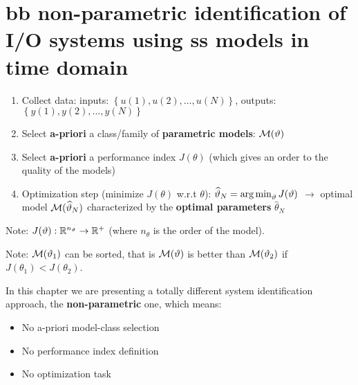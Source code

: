 \chapter{\acrlong{bb} non-parametric identification of I/O systems using \acrlong{ss} models in time domain}

\vspace{-12pt}
\begin{figure}[H]
    \centering
\end{figure}


\begin{remark}
\hfill \break
    \begin{enumerate}
        \item Collect data: inputs: $\left\{u(1), u(2), \ldots, u(N)\right\}$, outputs: $\left\{y(1), y(2), \ldots, y(N)\right\}$
        \item Select \textbf{a-priori} a class/family of \textbf{parametric models}: $\mathcal{M}(\vartheta)$
        \item Select \textbf{a-priori} a performance index $J(\theta)$ (which gives an order to the quality of the models)
        \item Optimization step (minimize $J(\theta)$ w.r.t $\theta$): $\widehat{\vartheta}_N = \operatorname*{arg\,min}_\vartheta J(\vartheta)$ $\rightarrow$ optimal model $\mathcal{M}(\widehat{\vartheta}_N)$ characterized by the \textbf{optimal parameters} $\hat{\theta}_N$
    \end{enumerate}
    
    Note:    $J(\vartheta): \mathbb{R}^{n_\vartheta} \rightarrow \mathbb{R}^+$ (where $n_\theta$ is the order of the model).
    
    Note: $\mathcal{M}(\vartheta_1)$ can be sorted, that is $\mathcal{M}(\vartheta)$ is better than $\mathcal{M}(\vartheta_2)$ if $J(\theta_1) < J(\theta_2)$.

\end{remark}

In this chapter we are presenting a totally different system identification approach, the \textbf{non-parametric} one, which means:
\begin{itemize}
    \item No a-priori model-class selection
    \item No performance index definition
    \item No optimization task
\end{itemize}

